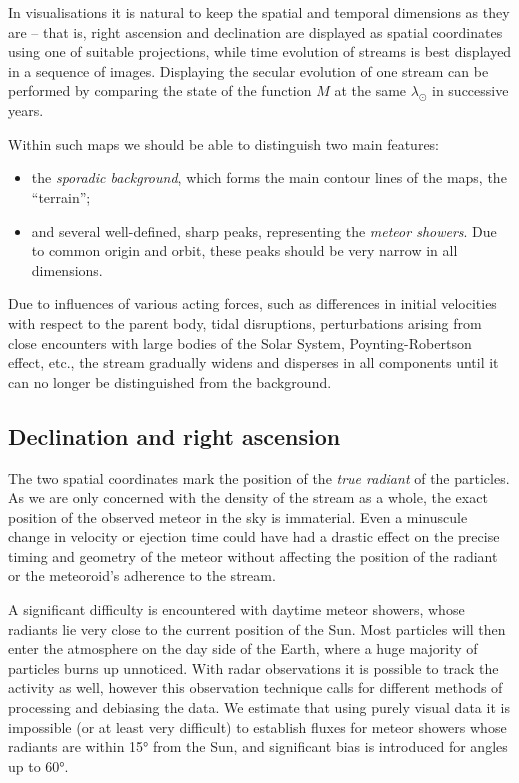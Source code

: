     In visualisations it is natural to keep the spatial and temporal dimensions as they are -- that is,
    right ascension and declination are displayed as spatial coordinates using one of suitable projections,
    while time evolution of streams is best displayed in a sequence of images.
    Displaying the secular evolution of one stream can be performed by comparing the state of the function $M$ at
    the same $\lambda_\odot$ in successive years.

    Within such maps we should be able to distinguish two main features:
    \begin{itemize}
        \item the \emph{sporadic background}, which forms the main contour lines of the maps, the ``terrain'';
        \item and several well-defined, sharp peaks, representing the \emph{meteor showers}. Due to common origin and orbit,
            these peaks should be very narrow in all dimensions.
    \end{itemize}

    Due to influences of various acting forces, such as differences
    in initial velocities with respect to the parent body, tidal disruptions,
    perturbations arising from close encounters with large bodies of the Solar System,
    Poynting-Robertson effect, etc., the stream
    gradually widens and disperses in all components until it can no longer be distinguished from the background.

    \subsection{Declination and right ascension} \label{ios}
        The two spatial coordinates mark the position of the \emph{true radiant} of the particles.
        As we are only concerned with the density of the stream as a whole,
        the exact position of the observed meteor in the sky is immaterial.
        Even a minuscule change in velocity or ejection time could have had a drastic effect
        on the precise timing and geometry of the meteor without affecting
        the position of the radiant or the meteoroid's adherence to the stream.

        A significant difficulty is encountered with daytime meteor showers, whose radiants
        lie very close to the current position of the Sun.
        Most particles will then enter the atmosphere on the day side
        of the Earth, where a huge majority of particles burns up unnoticed.
        With radar observations it is possible to track the activity as well,
        however this observation technique calls for different methods of processing and debiasing the data.
        We estimate that using purely visual data it is impossible (or at least very difficult) to establish fluxes
        for meteor showers whose radiants are within \ang{15} from the Sun, and significant bias
        is introduced for angles up to \ang{60}.

